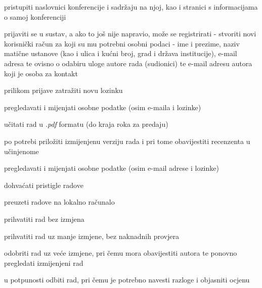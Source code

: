 			
			\begin{packed_enum}
				\item  {}
				
				\begin{packed_enum}
					
					\item pristupiti naslovnici konferencije i sadržaju na njoj, kao i stranici s informacijama o samoj konferenciji
					\item prijaviti se u sustav, a ako to još nije napravio, može se registrirati - stvoriti novi korisnički račun za koji su mu potrebni osobni podaci - ime i prezime, naziv matične ustanove (kao i ulica i kućni broj, grad i država institucije), e-mail adresa te ovisno o odabiru uloge autore rada (sudionici) te e-mail adresu autora koji je osoba za kontakt
					\item prilikom prijave zatražiti novu lozinku
					
				\end{packed_enum}
			
				\item  {}
				
				\begin{packed_enum}
					
					\item pregledavati i mijenjati osobne podatke (osim e-maila i lozinke)
					\item učitati rad u \textit{.pdf} formatu (do kraja roka za predaju)
					\item po potrebi priložiti izmijenjenu verziju rada i pri tome obavijestiti recenzenta u učinjenome
					
					
				\end{packed_enum}
				
				\item  {}
				
				\begin{packed_enum}
					
					\item pregledavati i mijenjati osobne podatke (osim e-mail adrese i lozinke)
					\item dohvaćati pristigle radove
					\item preuzeti radove na lokalno računalo
					\item prihvatiti rad bez izmjena
					\item prihvatiti rad uz manje izmjene, bez naknadnih provjera
					\item odobriti rad uz veće izmjene, pri čemu mora obavijestiti autora te ponovno pregledati izmijenjeni rad
					\item u potpunosti odbiti rad, pri čemu je potrebno navesti razloge i objasniti ocjenu
					

\end{packed_enum}
\end{packed_enum}
